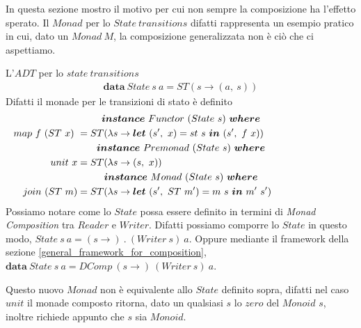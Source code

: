 \label{state_transitions}

In questa sezione mostro il motivo per cui non sempre la composizione ha
l'effetto sperato.
Il $Monad$ per lo $State\ transitions$ difatti rappresenta un esempio pratico
in cui, dato un $Monad\ M$, la composizione generalizzata non è ciò che ci
aspettiamo.\newline

L'$ADT$ per lo $state\ transitions$
\begin{align*}
  \bm{data}\ State\ s\ a = ST(s \to (a,\ s))
\end{align*}
Difatti il monade per le transizioni di stato è definito
\begin{align*}
  \classdef{\bm{instance}\ Functor\ (State\ s)\ \bm{where}}
  map\ f\ (ST\ x)\ &= ST(\lambda s \to \bm{let}\ (s',\ x) = st\ s\ \bm{in}\ (s',\ f\ x))\\
  \classdef{\bm{instance}\ Premonad\ (State\ s)\ \bm{where}}
  unit\ x &= ST(\lambda s \to (s,\ x))\\
  \classdef{\bm{instance}\ Monad\ (State\ s)\ \bm{where}}
  join\ (ST\ m) &= ST(\lambda s \to \bm{let}\ (s',\ ST\ m') = m\ s\ \bm{in}\ m'\ s')\\
\end{align*}
Possiamo notare come lo $State$ possa essere definito in termini di
\textit{Monad Composition} tra $Reader$ e $Writer$.
Difatti possiamo comporre lo $State$ in questo modo, $State\ s\ a = (s \to)\ .\ (Writer\ s)\ a$.
Oppure mediante il framework della sezione \ref{general_framework_for_composition},
$\bm{data}\ State\ s\ a = DComp\ (s \to)\ (Writer\ s)\ a$.\newline

Questo nuovo $Monad$ non è equivalente allo $State$ definito sopra, difatti nel caso
$unit$ il monade composto ritorna, dato un qualsiasi $s$ lo $zero$ del $Monoid$
$s$, inoltre richiede appunto che $s$ sia $Monoid$.\newline

